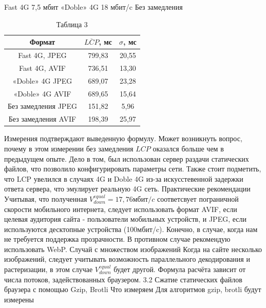 \documentclass[12pt]{article}
\begin{document}
    Fast 4G 7,5 мбит
    «Doble» 4G 18 мбит/c
    Без замедления

    \begin{table}[h!]
        \centering
        \caption{Таблица 3}
        \begin{tabular}{|c|c|c|}
            \hline
            Формат              & $\overline{LCP}$, мс & $\sigma$, мс \\
            \hline
            Fast 4G, JPEG       & 799,83               & 20,55        \\
            \hline
            Fast 4G, AVIF       & 736,51               & 13,30        \\
            \hline
            «Doble» 4G JPEG     & 689,07               & 23,28        \\
            \hline
            «Doble» 4G AVIF     & 689,65               & 15,64        \\
            \hline
            Без замедления JPEG & 151,82               & 5,96         \\
            \hline
            Без замедления AVIF & 198,39               & 25,97        \\
            \hline
        \end{tabular}
    \end{table}

    Измерения подтверждают выведенную формулу. Может возникнуть вопрос, почему в этом измерении без замедления $LCP$ оказался больше чем в предыдущем опыте.
    Дело в том, был использован сервер раздачи статических файлов, что позволило конфигурировать параметры сети. Также стоит подметить, что LCP увелился в случаях 4G и Doble 4G из-за искусстевенной задержки ответа сервера, что эмулирует реальную 4G сеть.
    Практические рекомендации
    Учитывая, что полученная $V^{equal}_{down} = 17,76 мбит/c$ соответсвует пограничной скорости мобильного интернета, следует использовать формат AVIF, если целевая аудитория сайта - пользователи мобильных устройств, и JPEG, если используются десктопные устройства (100мбит/c). Конечно, в случае, когда нам не требуется поддержка прозрачности. В противном случае рекомендую использовать WebP.
    Случай с множеством изображений
    Когда на сайте несколько изображений, следует учитывать возможность параллельного декодирования и растеризации, в этом случае $V^{equal}_{down}$ будет другой. Формула расчёта зависит от числа потоков, задействованных браузером.
    3.2 Сжатие статических файлов браузера с помощью Gzip, Brotli
    Что измеряем
    Для алгоритмов gzip, brotli будут измерены
\end{document}
